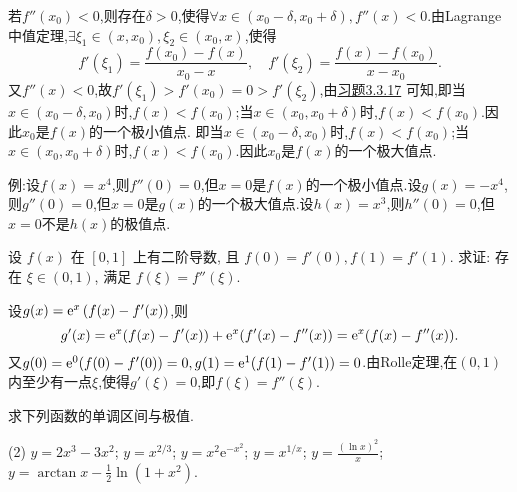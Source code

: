\begin{solution}
    若$f''(x_0) < 0$,则存在$\delta > 0$,使得$\forall x \in (x_0 - \delta, x_0 + \delta), f''(x) < 0$.由Lagrange中值定理,$\exists \xi_1 \in (x, x_0), \xi_2 \in (x_0, x)$,使得
    $$
        f'(\xi_1) = \frac{f(x_0)-f(x)}{x_0 - x}, \quad f'(\xi_2) = \frac{f(x)-f(x_0)}{x - x_0}.
    $$
    又$f''(x) < 0$,故$f'(\xi_1) > f'(x_0) = 0 > f'(\xi_2)$,由\hyperref[ex:3.3.17]{习题3.3.17} 可知,即当$x \in (x_0 - \delta, x_0)$时,$f(x) < f(x_0)$;当$x \in (x_0, x_0 + \delta)$时,$f(x) < f(x_0)$.因此$x_0$是$f(x)$的一个极小值点.
    即当$x \in (x_0 - \delta, x_0)$时,$f(x) < f(x_0)$;当$x \in (x_0, x_0 + \delta)$时,$f(x) < f(x_0)$.因此$x_0$是$f(x)$的一个极大值点.

    例:设$f(x) = x^4$,则$f''(0) = 0$,但$x = 0$是$f(x)$的一个极小值点.设$g(x) = -x^4$,则$g''(0) = 0$,但$x = 0$是$g(x)$的一个极大值点.设$h(x) = x^3$,则$h''(0) = 0$,但$x = 0$不是$h(x)$的极值点.
\end{solution}

\begin{exercise}[3.3.20]
    设 $f(x)$ 在 $[0,1]$ 上有二阶导数, 且 $f(0)=f'(0), f(1)=f'(1)$. 求证: 存在 $\xi \in (0,1)$, 满足 $f(\xi)=f''(\xi)$.
\end{exercise}

\begin{solution}
    设$g(x) = \mathrm{e}^x \left( f(x) - f'(x) \right)$,则
    $$
        g'(x) = \mathrm{e}^x (f(x) - f'(x)) + \mathrm{e}^x (f'(x) - f''(x)) = \mathrm{e}^x (f(x) - f''(x)).
    $$
    又$g(0) = \mathrm{e}^0 (f(0) - f'(0)) = 0, g(1) = \mathrm{e}^1 (f(1) - f'(1)) = 0$.由Rolle定理,在$(0,1)$内至少有一点$\xi$,使得$g'(\xi) = 0$,即$f(\xi) = f''(\xi)$.
\end{solution}

\begin{exercise}[3.3.21]
    求下列函数的单调区间与极值.
    \begin{tasks}[label=(\arabic*)](2)
        \task $y = 2x^3-3x^2$;
        \task $y = x^{2/3}$;
        \task $y = x^2\mathrm{e}^{-x^2}$;
        \task $y = x^{1/x}$;
        \task $y = \frac{(\ln x)^2}{x}$;
        \task $y = \arctan x - \frac{1}{2}\ln(1+x^2)$.
    \end{tasks}
\end{exercise}

